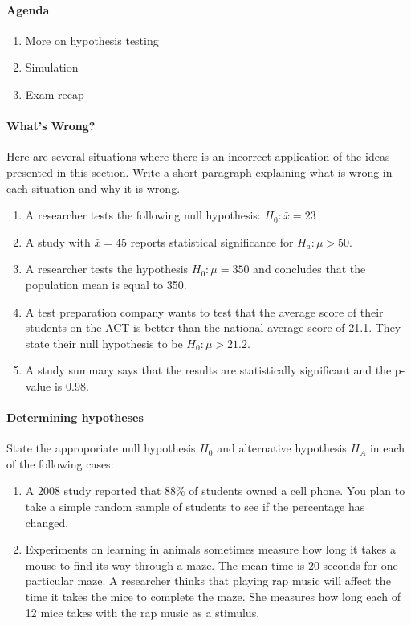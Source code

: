 \documentclass[10pt]{article}\usepackage[]{graphicx}\usepackage[]{color}
\begin{document}
\paragraph{Agenda}
\begin{enumerate}
  \itemsep0em
  \item More on hypothesis testing
  \item Simulation
  \item Exam recap
\end{enumerate}

\paragraph{What's Wrong?}

Here are several situations where there is an incorrect application of the ideas presented in this section. Write a short paragraph explaining what is wrong in each situation and why it is wrong. 

\begin{enumerate}
  \itemsep0.5in
  \item A researcher tests the following null hypothesis: $H_0 : \bar{x} = 23$
  \item A study with $\bar{x} = 45$ reports statistical significance for $H_a : \mu > 50$. 
  \item A researcher tests the hypothesis $H_0 : \mu = 350$ and concludes that the population mean is equal to 350. 
  \item A test preparation company wants to test that the average score of their students on the ACT is better than the national average score of 21.1. They state their null hypothesis to be $H_0 : \mu > 21.2$. 
  \item A study summary says that the results are statistically significant and the p-value is 0.98. 
\end{enumerate}


\paragraph{Determining hypotheses}
State the approporiate null hypothesis $H_0$ and alternative hypothesis $H_A$ in each of the following cases:
\begin{enumerate}
  \itemsep0.5in
  \item A 2008 study reported that 88\% of students owned a cell phone. You plan to take a simple random sample of students to see if the percentage has changed. 
  \item Experiments on learning in animals sometimes measure how long it takes a mouse to find its way through a maze. The mean time is 20 seconds for one particular maze. A researcher thinks that playing rap music will affect the time it takes the mice to complete the maze. She measures how long each of 12 mice takes with the rap music as a stimulus. 
  \vspace{0.75in}
\end{enumerate}
\end{document}
